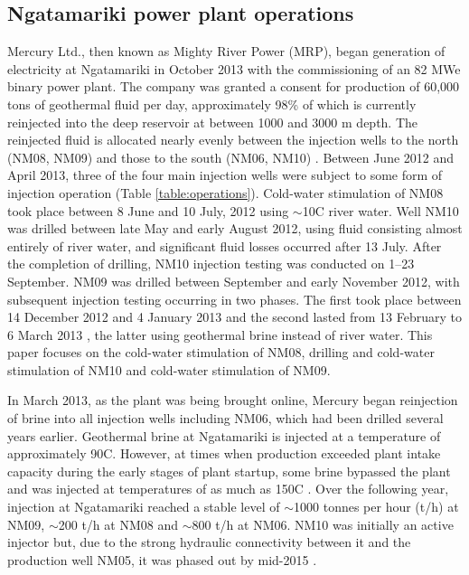\subsection{Ngatamariki power plant operations} \label{Plant_ops}
Mercury Ltd., then known as Mighty River Power (MRP), began generation of electricity at Ngatamariki in October 2013 with the commissioning of an 82 MWe binary power plant. The company was granted a consent for production of 60,000 tons of geothermal fluid per day, approximately 98\% of which is currently reinjected into the deep reservoir at between 1000 and 3000 m depth. The reinjected fluid is allocated nearly evenly between the injection wells to the north (NM08, NM09) and those to the south (NM06, NM10) \citep{Clearwater_2015,buscarlet_2015}. Between June 2012 and April 2013, three of the four main injection wells were subject to some form of injection operation (Table \ref{table:operations}). Cold-water stimulation of NM08 took place between 8 June and 10 July, 2012 using $\sim$10\textdegree{}C river water. Well NM10 was drilled between late May and early August 2012, using fluid consisting almost entirely of river water, and significant fluid losses occurred after 13 July. After the completion of drilling, NM10 injection testing was conducted on 1--23 September. NM09 was drilled between September and early November 2012, with subsequent injection testing occurring in two phases. The first took place between 14 December 2012 and 4 January 2013 and the second lasted from 13 February to 6 March 2013 \citep{Clearwater_2015}, the latter using geothermal brine instead of river water. This paper focuses on the cold-water stimulation of NM08, drilling and cold-water stimulation of NM10 and cold-water stimulation of NM09.

In March 2013, as the plant was being brought online, Mercury began reinjection of brine into all injection wells including NM06, which had been drilled several years earlier. Geothermal brine at Ngatamariki is injected at a temperature of approximately 90\textdegree C. However, at times when production exceeded plant intake capacity during the early stages of plant startup, some brine bypassed the plant and was injected at temperatures of as much as 150\textdegree C \citep{Clearwater_2015}. Over the following year, injection at Ngatamariki reached a stable level of $\sim$1000 tonnes per hour (t/h) at NM09, $\sim$200 t/h at NM08 and $\sim$800 t/h at NM06. NM10 was initially an active injector but, due to the strong hydraulic connectivity between it and the production well NM05, it was phased out by mid-2015 \citep{buscarlet_2015}.

